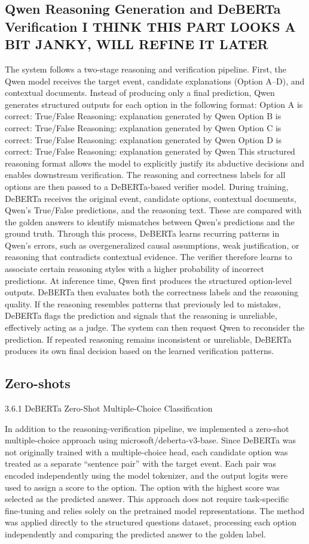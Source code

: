 \documentclass{article}
\begin{document}
\subsection{Qwen Reasoning Generation and DeBERTa Verification I THINK THIS PART LOOKS A BIT JANKY, WILL REFINE IT LATER}
The system follows a two-stage reasoning and verification pipeline. First, the Qwen model receives the target event, candidate explanations (Option A–D), and contextual documents. Instead of producing only a final prediction, Qwen generates structured outputs for each option in the following format:
Option A is correct: True/False
Reasoning: explanation generated by Qwen
Option B is correct: True/False
Reasoning: explanation generated by Qwen
Option C is correct: True/False
Reasoning: explanation generated by Qwen
Option D is correct: True/False
Reasoning: explanation generated by Qwen
This structured reasoning format allows the model to explicitly justify its abductive decisions and enables downstream verification. The reasoning and correctness labels for all options are then passed to a DeBERTa-based verifier model.
During training, DeBERTa receives the original event, candidate options, contextual documents, Qwen’s True/False predictions, and the reasoning text. These are compared with the golden answers to identify mismatches between Qwen’s predictions and the ground truth. Through this process, DeBERTa learns recurring patterns in Qwen’s errors, such as overgeneralized causal assumptions, weak justification, or reasoning that contradicts contextual evidence. The verifier therefore learns to associate certain reasoning styles with a higher probability of incorrect predictions.
At inference time, Qwen first produces the structured option-level outputs. DeBERTa then evaluates both the correctness labels and the reasoning quality. If the reasoning resembles patterns that previously led to mistakes, DeBERTa flags the prediction and signals that the reasoning is unreliable, effectively acting as a judge. The system can then request Qwen to reconsider the prediction. If repeated reasoning remains inconsistent or unreliable, DeBERTa produces its own final decision based on the learned verification patterns.

\subsection{Zero-shots}
{3.6.1 DeBERTa Zero-Shot Multiple-Choice Classification }

In addition to the reasoning-verification pipeline, we implemented a zero-shot multiple-choice approach using microsoft/deberta-v3-base. Since DeBERTa was not originally trained with a multiple-choice head, each candidate option was treated as a separate “sentence pair” with the target event. Each pair was encoded independently using the model tokenizer, and the output logits were used to assign a score to the option. The option with the highest score was selected as the predicted answer. This approach does not require task-specific fine-tuning and relies solely on the pretrained model representations. The method was applied directly to the structured questions dataset, processing each option independently and comparing the predicted answer to the golden label.
\end{document}
